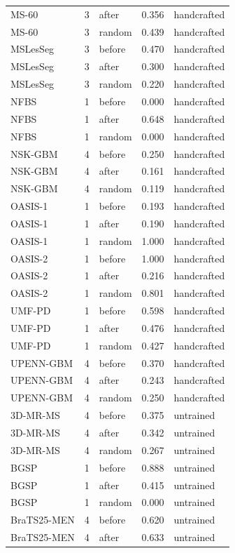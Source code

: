 \begin{tabular}{lrlrl}
MS-60 & 3 & after & 0.356 & handcrafted \\
MS-60 & 3 & random & 0.439 & handcrafted \\
MSLesSeg & 3 & before & 0.470 & handcrafted \\
MSLesSeg & 3 & after & 0.300 & handcrafted \\
MSLesSeg & 3 & random & 0.220 & handcrafted \\
NFBS & 1 & before & 0.000 & handcrafted \\
NFBS & 1 & after & 0.648 & handcrafted \\
NFBS & 1 & random & 0.000 & handcrafted \\
NSK-GBM & 4 & before & 0.250 & handcrafted \\
NSK-GBM & 4 & after & 0.161 & handcrafted \\
NSK-GBM & 4 & random & 0.119 & handcrafted \\
OASIS-1 & 1 & before & 0.193 & handcrafted \\
OASIS-1 & 1 & after & 0.190 & handcrafted \\
OASIS-1 & 1 & random & 1.000 & handcrafted \\
OASIS-2 & 1 & before & 1.000 & handcrafted \\
OASIS-2 & 1 & after & 0.216 & handcrafted \\
OASIS-2 & 1 & random & 0.801 & handcrafted \\
UMF-PD & 1 & before & 0.598 & handcrafted \\
UMF-PD & 1 & after & 0.476 & handcrafted \\
UMF-PD & 1 & random & 0.427 & handcrafted \\
UPENN-GBM & 4 & before & 0.370 & handcrafted \\
UPENN-GBM & 4 & after & 0.243 & handcrafted \\
UPENN-GBM & 4 & random & 0.250 & handcrafted \\
3D-MR-MS & 4 & before & 0.375 & untrained \\
3D-MR-MS & 4 & after & 0.342 & untrained \\
3D-MR-MS & 4 & random & 0.267 & untrained \\
BGSP & 1 & before & 0.888 & untrained \\
BGSP & 1 & after & 0.415 & untrained \\
BGSP & 1 & random & 0.000 & untrained \\
BraTS25-MEN & 4 & before & 0.620 & untrained \\
BraTS25-MEN & 4 & after & 0.633 & untrained \\

\end{tabular}

